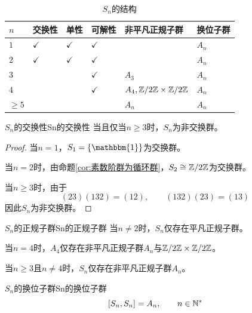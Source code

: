 \begin{table}[H]
	\centering
	\caption{$S_n$的结构}
	\begin{tabular}{|>{\centering\arraybackslash}m{1cm}|>{\centering\arraybackslash}m{1.5cm}|>{\centering\arraybackslash}m{1cm}|>{\centering\arraybackslash}m{1.5cm}|>{\centering\arraybackslash}m{3cm}|>{\centering\arraybackslash}m{2cm}|}
		\hline
		$n$     & \textbf{交换性} & \textbf{单性} & \textbf{可解性}      & \textbf{非平凡正规子群} & \textbf{换位子群}    \\
		\hline
		$1$     & $\checkmark$    & $\checkmark$ & $\checkmark$         &                       & $A_n$    \\
		\hline
		$2$     & $\checkmark$    & $\checkmark$ & $\checkmark$         &                       & $A_n$    \\
		\hline
		$3$     &                 &              & $\checkmark$         &    $A_3$              & $A_n$    \\
		\hline
		$4$     &                 &              & $\checkmark$         & $A_4,\mathbb{Z}/2\mathbb{Z}\times\mathbb{Z}/2\mathbb{Z}$  & $A_n$ \\
		\hline
		$\ge 5$ &                 & &                      &    $A_n$              & $A_n$                \\   
		\hline
	\end{tabular}
\end{table}

\begin{proposition}{$S_n$的交换性}{Sn的交换性}
	当且仅当$n\ge 3$时，$S_n$为非交换群。
\end{proposition}

\begin{proof}
	当$n=1$，$S_1=\{\mathbbm{1}\}$为交换群。
	
	当$n=2$时，由命题\ref{cor:素数阶群为循环群}，$S_2\cong\mathbb{Z}/2\mathbb{Z}$为交换群。
	
	当$n\ge 3$时，由于
	$$
	(23)(132)=(12),\qquad 
	(132)(23)=(13)
	$$
	因此$S_n$为非交换群。
\end{proof}

\begin{proposition}{$S_n$的正规子群}{Sn的正规子群}
	当$n\ne 2$时，$S_n$仅存在平凡正规子群。
	
	当$n=4$时，$A_4$仅存在非平凡正规子群$A_n$与$\mathbb{Z}/2\mathbb{Z}\times\mathbb{Z}/2\mathbb{Z}$。
	
	当$n\ge 3$且$n\ne 4$时，$S_n$仅存在非平凡正规子群$A_n$。
\end{proposition}

\begin{proposition}{$S_n$的换位子群}{Sn的换位子群}
	$$
	[S_n,S_n]=A_n,\qquad n\in\mathbb{N}^*
	$$
\end{proposition}

